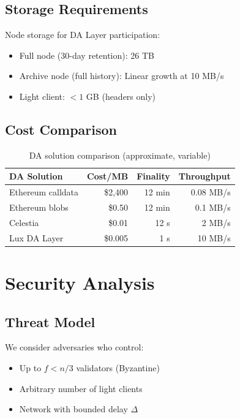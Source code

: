 \documentclass[11pt,a4paper]{article}
\begin{document}
\subsection{Storage Requirements}

Node storage for DA Layer participation:

\begin{itemize}
    \item Full node (30-day retention): 26 TB
    \item Archive node (full history): Linear growth at 10 MB/s
    \item Light client: $< 1$ GB (headers only)
\end{itemize}

\subsection{Cost Comparison}

\begin{table}[h]
\centering
\begin{tabular}{lrrr}
\toprule
\textbf{DA Solution} & \textbf{Cost/MB} & \textbf{Finality} & \textbf{Throughput} \\
\midrule
Ethereum calldata & \$2,400 & 12 min & 0.08 MB/s \\
Ethereum blobs & \$0.50 & 12 min & 0.1 MB/s \\
Celestia & \$0.01 & 12 s & 2 MB/s \\
Lux DA Layer & \$0.005 & 1 s & 10 MB/s \\
\bottomrule
\end{tabular}
\caption{DA solution comparison (approximate, variable)}
\end{table}

\section{Security Analysis}

\subsection{Threat Model}

We consider adversaries who control:
\begin{itemize}
    \item Up to $f < n/3$ validators (Byzantine)
    \item Arbitrary number of light clients
    \item Network with bounded delay $\Delta$
\end{itemize}
\end{document}
